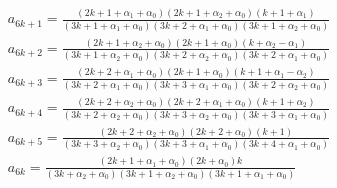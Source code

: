 \documentclass{report}
\begin{document}
$$
\begin{array}{lllllllllllllll}
a_{6k+1}=\displaystyle
\frac
{(2k+1+\alpha_1+\alpha_0)(2k+1+\alpha_2+\alpha_0)(k+1+\alpha_1)}
{(3k+1+\alpha_1+\alpha_0)(3k+2+\alpha_1+\alpha_0)(3k+1+\alpha_2+\alpha_0)}
\\
a_{6k+2}=\displaystyle\frac
{(2k+1+\alpha_2+\alpha_0)(2k+1+\alpha_0)(k+\alpha_2-\alpha_1)}
{(3k+1+\alpha_2+\alpha_0)(3k+2+\alpha_2+\alpha_0)(3k+2+\alpha_1+\alpha_0)}
\\
a_{6k+3}=\displaystyle\frac
{(2k+2+\alpha_1+\alpha_0)(2k+1+\alpha_0)(k+1+\alpha_1-\alpha_2)}
{(3k+2+\alpha_1+\alpha_0)(3k+3+\alpha_1+\alpha_0)(3k+2+\alpha_2+\alpha_0)}
\\
a_{6k+4}=\displaystyle\frac
{(2k+2+\alpha_2+\alpha_0)(2k+2+\alpha_1+\alpha_0)(k+1+\alpha_2)}
{(3k+2+\alpha_2+\alpha_0)(3k+3+\alpha_2+\alpha_0)(3k+3+\alpha_1+\alpha_0)}
\\
a_{6k+5}=\displaystyle\frac
{(2k+2+\alpha_2+\alpha_0)(2k+2+\alpha_0)(k+1)}
{(3k+3+\alpha_2+\alpha_0)(3k+3+\alpha_1+\alpha_0)(3k+4+\alpha_1+\alpha_0)}
\\
a_{6k}=\displaystyle\frac {(2k+1+\alpha_1+\alpha_0)(2k+\alpha_0)k}
{(3k+\alpha_2+\alpha_0)(3k+1+\alpha_2+\alpha_0)(3k+1+\alpha_1+\alpha_0)}
\end{array}
$$ 

\newpage
\end{document}
